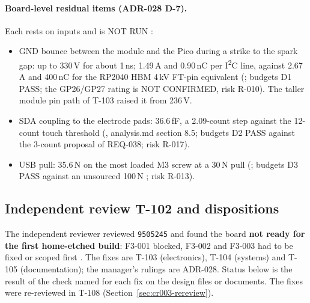 \paragraph{Board-level residual items (ADR-028 D-7).} Each rests on
 inputs and is NOT RUN \lbl{[PHYSICAL]}:
\begin{itemize}[noitemsep]
  \item GND bounce between the module and the Pico during a strike to the spark gap:
        up to 330\,V for about 1\,ns; 1.49\,A and 0.90\,nC per I\textsuperscript{2}C
        line, against 2.67\,A and 400\,nC for the RP2040 HBM 4\,kV FT-pin equivalent
        (; budgets D1 PASS; the GP26/GP27 rating is NOT CONFIRMED,
        risk R-010). The taller module pin path of T-103 raised it from 236\,V.
  \item SDA coupling to the electrode pads: 36.6\,fF, a 2.09-count step against the
        12-count touch threshold (, analysis.md section 8.5; budgets
        D2 PASS against the 3-count proposal of REQ-038; risk R-017).
  \item USB pull: 35.6\,N on the most loaded M3 screw at a 30\,N pull
        (; budgets D3 PASS against an unsourced 100\,N
        ; risk R-013).
\end{itemize}

\subsection{Independent review T-102 and dispositions}
\label{sec:cr003-review}

The independent reviewer reviewed \texttt{9505245} and found the board \textbf{not
ready for the first home-etched build}: F3-001 blocked, F3-002 and F3-003 had to be
fixed or scoped first . The fixes are T-103
(electronics), T-104 (systems) and T-105 (documentation); the manager's rulings are
ADR-028. Status below is the result of the check named for each fix on the design
files or documents. The fixes were re-reviewed in T-108 (Section~\ref{sec:cr003-rereview}).

